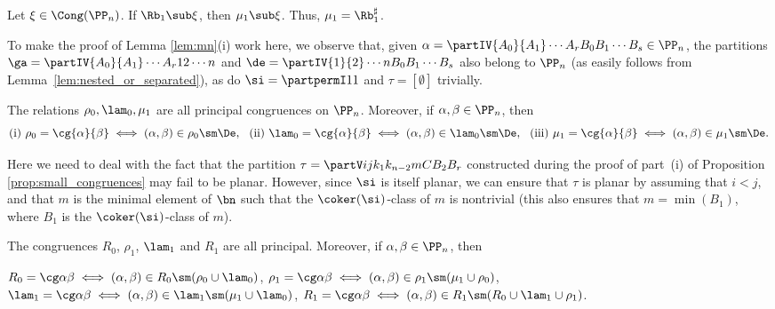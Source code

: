 \begin{lemma}
\label{lem:mn:PPn}
Let $\xi\in\Cong(\PP_n)$.
If $\Rb_1\sub\xi$, then $\mu_1\sub\xi$.  Thus, $\mu_1=\Rb_1^\sharp$.
\end{lemma}

\pf 
To make the proof of Lemma \ref{lem:mn}(i) work here, we observe that, given
${\alpha=\partIV{A_0}{A_1}\cdots{A_r}{B_0}{B_1}\cdots{B_s}\in\PP_n}$,
the partitions
$\ga=\partIV{A_0}{A_1}\cdots{A_r}{1}{2}\cdots{n}$ and $\de=\partIV{1}{2}\cdots{n}{B_0}{B_1}\cdots{B_s}$ also belong to $\PP_n$ (as easily follows from Lemma~\ref{lem:nested_or_separated}),
as do
$\si=\partpermI11$ and $\tau=[\emptyset]$ trivially.
\epf

\begin{prop}
\label{prop:small_congruences:PPn}
The relations $\rho_0,\lam_0,\mu_1$ are all principal congruences on $\PP_n$.  Moreover, if $\alpha,\beta\in\PP_n$, then
\[
\textup{(i)}\ 
\rho_0=\cg{\alpha}{\beta}\iff (\alpha,\beta)\in\rho_0\sm\De,\ \ 
\textup{(ii)}\ \lam_0=\cg{\alpha}{\beta}\iff (\alpha,\beta)\in\lam_0\sm\De,\ \ 
\textup{(iii)}\ \mu_1=\cg{\alpha}{\beta}\iff (\alpha,\beta)\in\mu_1\sm\De.
\]
\end{prop}

\pf 
Here we need to deal with the fact that the partition $\tau=\partV ij{k_1}{k_{n-2}}{m}{C}{B_2}{B_r}$ constructed during the proof of part~(i) 
of Proposition \ref{prop:small_congruences}
may fail to be planar.  However, since $\si$ is itself planar, we can ensure that $\tau$ is planar by assuming that $i<j$, and that $m$ is the minimal element of $\bn$ such that the $\coker(\si)$-class of $m$ is nontrivial (this also ensures that $m=\min(B_1)$, where $B_1$ is the $\coker(\si)$-class of $m$).  \epf


%
\begin{prop}
\label{prop:joins2:PPn}
The congruences $R_0$, $\rho_1$, $\lam_1$ and $R_1$ are all principal.  Moreover, if $\alpha,\beta\in\PP_n$, then
\begin{itemize}\begin{multicols}{2}
\itemit{i} $R_0=\cg\alpha\beta\iff (\alpha,\beta)\in R_0 \sm(\rho_0\cup\lam_0)$,
\itemit{ii} $\rho_1=\cg\alpha\beta\iff (\alpha,\beta)\in\rho_1\sm(\mu_1\cup\rho_0)$,
\itemit{iii} $\lam_1=\cg\alpha\beta\iff (\alpha,\beta)\in\lam_1\sm(\mu_1\cup\lam_0)$, 
\itemit{iv} $R_1=\cg\alpha\beta\iff (\alpha,\beta)\in R_1\sm ( R_0 \cup \lam_1 \cup \rho_1 )$.
\end{multicols}
\end{itemize}
\end{prop}

